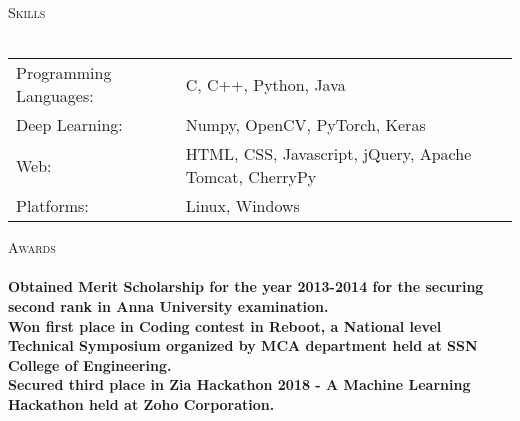 \documentclass[a4paper]{article}
\newcommand{\lineunder} {
    \vspace*{-8pt} \\
    \hspace*{-18pt} \hrulefill \\
}
\newcommand{\header} [1] {
    {\hspace*{-18pt}\vspace*{6pt} \textsc{#1}}
    \vspace*{-6pt} \lineunder
}
\begin{document}
\header{Skills}
\begin{tabular}{ l l }
    Programming Languages: & C, C++, Python, Java                                   \\
    Deep Learning:         & Numpy, OpenCV, PyTorch, Keras                          \\
    Web:                   & HTML, CSS, Javascript, jQuery, Apache Tomcat, CherryPy \\
    Platforms:             & Linux, Windows                                         \\
\end{tabular}
\vspace{2mm}

\header{Awards}
\textbf{Obtained Merit Scholarship for the year 2013-2014 for the securing second rank in Anna University examination.}\\

\vspace*{2mm}
\textbf{Won first place in Coding contest in Reboot, a National level Technical Symposium organized by MCA department held at SSN College of Engineering.}\\

\vspace*{2mm}
\textbf{Secured third place in Zia Hackathon 2018 - A Machine Learning Hackathon held at Zoho Corporation.}\\

\vspace*{2mm}

\ 
\end{document}
